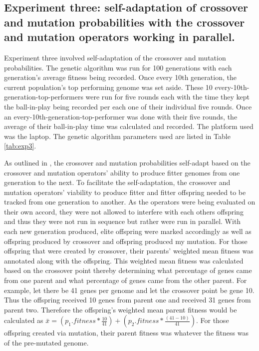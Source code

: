 \documentclass[a4paper,10pt]{article}
\begin{document}
\subsection{Experiment three: self-adaptation of crossover and mutation probabilities with the crossover and mutation operators working in parallel.}

Experiment three involved self-adaptation of the crossover and mutation probabilities. The genetic algorithm was run for 100 generations with each generation's average fitness being recorded. Once every 10th generation, the current population's top performing genome was set aside. These 10 every-10th-generation-top-performers were run for five rounds each with the time they kept the ball-in-play being recorded per each one of their individual five rounds. Once an every-10th-generation-top-performer was done with their five rounds, the average of their ball-in-play time was calculated and recorded. The platform used was the laptop. The genetic algorithm parameters used are listed in Table \ref{tab:exp3}.

As outlined in \cite{self_adapt}, the crossover and mutation probabilities self-adapt based on the crossover and mutation operators' ability to produce fitter genomes from one generation to the next. To facilitate the self-adaptation, the crossover and mutation operators' viability to produce fitter and fitter offspring needed to be tracked from one generation to another. As the operators were being evaluated on their own accord, they were not allowed to interfere with each others offspring and thus they were not run in sequence but rather were run in parallel. With each new generation produced, elite offspring were marked accordingly as well as offspring produced by crossover and offspring produced my mutation. For those offspring that were created by crossover, their parents' weighted mean fitness was annotated along with the offspring. This weighted mean fitness was calculated based on the crossover point thereby determining what percentage of genes came from one parent and what percentage of genes came from the other parent. For example, let there be 41 genes per genome and let the crossover point be gene 10. Thus the offspring received 10 genes from parent one and received 31 genes from parent two. Therefore the offspring's weighted mean parent fitness would be calculated as $\bar{x} = \left ( p_1.fitness * \frac{10}{41} \right ) + \left (p_2.fitness * \frac{(41-10)}{41} \right)$. For those offspring created via mutation, their parent fitness was whatever the fitness was of the pre-mutated genome. 
\end{document}
